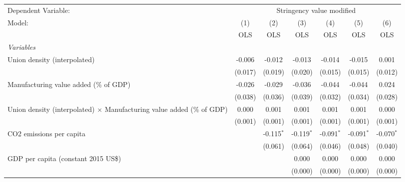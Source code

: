 
\begingroup
\centering
\begin{tabular}{lcccccc}
   \toprule
   Dependent Variable: & \multicolumn{6}{c}{Stringency value modified}\\
   Model:                                                                        & (1)     & (2)          & (3)          & (4)          & (5)          & (6)\\  
                                                                                 &  OLS    & OLS          & OLS          & OLS          & OLS          & OLS\\  
   \midrule
   \emph{Variables}\\
   Union density (interpolated)                                                  & -0.006  & -0.012       & -0.013       & -0.014       & -0.015       & 0.001\\   
                                                                                 & (0.017) & (0.019)      & (0.020)      & (0.015)      & (0.015)      & (0.012)\\   
   Manufacturing value added (\% of GDP)                                         & -0.026  & -0.029       & -0.036       & -0.044       & -0.044       & 0.024\\   
                                                                                 & (0.038) & (0.036)      & (0.039)      & (0.032)      & (0.034)      & (0.028)\\   
   Union density (interpolated) $\times$ Manufacturing value added (\% of GDP)   & 0.000   & 0.001        & 0.001        & 0.001        & 0.001        & 0.000\\   
                                                                                 & (0.001) & (0.001)      & (0.001)      & (0.001)      & (0.001)      & (0.001)\\   
   CO2 emissions per capita                                                      &         & -0.115$^{*}$ & -0.119$^{*}$ & -0.091$^{*}$ & -0.091$^{*}$ & -0.070$^{*}$\\   
                                                                                 &         & (0.061)      & (0.064)      & (0.046)      & (0.048)      & (0.040)\\   
   GDP per capita (constant 2015 US\$)                                           &         &              & 0.000        & 0.000        & 0.000        & 0.000\\   
                                                                                 &         &              & (0.000)      & (0.000)      & (0.000)      & (0.000)\\   

\end{tabular}
